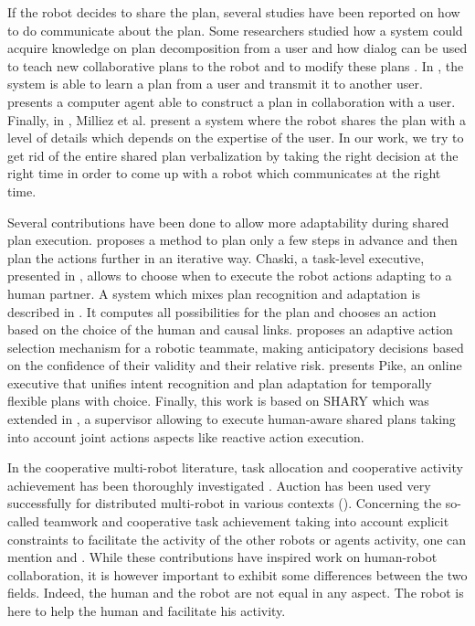 \documentclass[english,a4paper,11pt,twoside]{StyleThese}
\begin{document}
If the robot decides to share the plan, several studies have been reported on how to do communicate about the plan. Some researchers studied how a system could acquire knowledge on plan decomposition from a user \cite{Mohseni2015} and how dialog can be used to teach new collaborative plans to the robot and to modify these plans \cite{petit2013coordinating}. In \cite{sorce2015proof}, the system is able to learn a plan from a user and transmit it to another user. \cite{allen2002human} presents a computer agent able to construct a plan in collaboration with a user. Finally, in \cite{milliez2016using}, Milliez et al. present a system where the robot shares the plan with a level of details which depends on the expertise of the user. In our work, we try to get rid of the entire shared plan verbalization by taking the right decision at the right time in order to come up with a robot which communicates at the right time.

Several contributions have been done to allow more adaptability during shared plan execution. \cite{chien2000using} proposes a method to plan only a few steps in advance and then plan the actions further in an iterative way. Chaski, a task-level
executive, presented in \cite{shah2011improved}, allows to choose when to execute the robot actions adapting to a human partner. A system which mixes plan recognition and adaptation is described in \cite{levine2014concurrent}. It computes all possibilities for the plan and chooses an action based on the choice of the human and causal links. \cite{hoffman2007effects} proposes an adaptive action selection mechanism for a robotic teammate, making anticipatory decisions based on the confidence of their validity and their relative risk. \cite{karpas2015robust} presents Pike, an online executive that unifies intent recognition and plan adaptation for temporally flexible plans with choice. Finally, this work is based on SHARY \cite{clodic2009shary} which was extended in \cite{fiore2014planning}, a supervisor allowing to execute human-aware shared plans taking into account joint actions aspects like reactive action execution.

In the cooperative multi-robot literature, task allocation and cooperative activity achievement has been thoroughly investigated \cite{gerkey2004formal}. Auction has been used very successfully for distributed multi-robot in various contexts (\cite{gerkey2002sold,botelho1999m+}). 
Concerning the so-called teamwork and cooperative task achievement taking into account explicit constraints to facilitate the activity of the other robots or agents activity, one can mention \cite{tambe1997agent} and \cite{joyeux2009plan}. While these contributions have inspired work on human-robot collaboration, it is however important to exhibit some differences between the two fields. Indeed, the human and the robot are not equal in any aspect. The robot is here to help the human and facilitate his activity.
\end{document}
